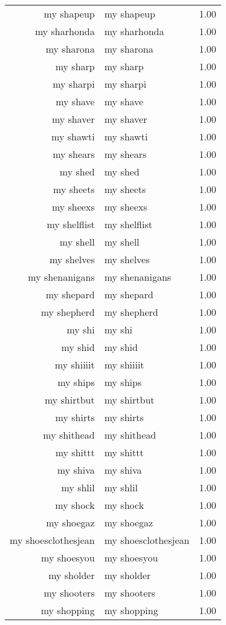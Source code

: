 \begin{table}[ht]
\begin{tabular}{rlr}
  my shapeup & my shapeup & 1.00 \\ 
  my sharhonda & my sharhonda & 1.00 \\ 
  my sharona & my sharona & 1.00 \\ 
  my sharp & my sharp & 1.00 \\ 
  my sharpi & my sharpi & 1.00 \\ 
  my shave & my shave & 1.00 \\ 
  my shaver & my shaver & 1.00 \\ 
  my shawti & my shawti & 1.00 \\ 
  my shears & my shears & 1.00 \\ 
  my shed & my shed & 1.00 \\ 
  my sheets & my sheets & 1.00 \\ 
  my sheexs & my sheexs & 1.00 \\ 
  my shelflist & my shelflist & 1.00 \\ 
  my shell & my shell & 1.00 \\ 
  my shelves & my shelves & 1.00 \\ 
  my shenanigans & my shenanigans & 1.00 \\ 
  my shepard & my shepard & 1.00 \\ 
  my shepherd & my shepherd & 1.00 \\ 
  my shi & my shi & 1.00 \\ 
  my shid & my shid & 1.00 \\ 
  my shiiiit & my shiiiit & 1.00 \\ 
  my ships & my ships & 1.00 \\ 
  my shirtbut & my shirtbut & 1.00 \\ 
  my shirts & my shirts & 1.00 \\ 
  my shithead & my shithead & 1.00 \\ 
  my shittt & my shittt & 1.00 \\ 
  my shiva & my shiva & 1.00 \\ 
  my shlil & my shlil & 1.00 \\ 
  my shock & my shock & 1.00 \\ 
  my shoegaz & my shoegaz & 1.00 \\ 
  my shoesclothesjean & my shoesclothesjean & 1.00 \\ 
  my shoesyou & my shoesyou & 1.00 \\ 
  my sholder & my sholder & 1.00 \\ 
  my shooters & my shooters & 1.00 \\ 
  my shopping & my shopping & 1.00 \\ 

\end{tabular}
\end{table}
